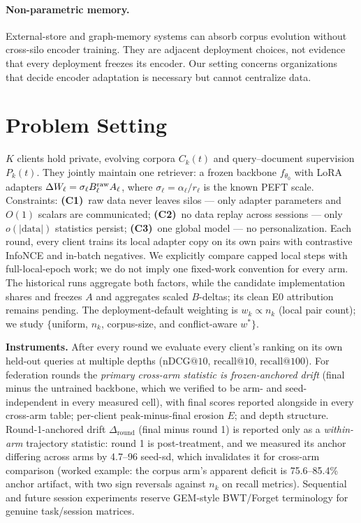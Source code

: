 \documentclass[sigconf,anonymous,review]{acmart}
\makeatletter
\newcommand{\ndcg}{\mathrm{nDCG@10}}
\newcommand{\rc}[1]{\mathrm{recall@#1}}
\newcommand{\RoundDrift}{\Delta_{\mathrm{round}}}
\makeatother
\begin{document}
\paragraph{Non-parametric memory.} External-store and graph-memory systems can absorb corpus evolution without cross-silo encoder training. They are adjacent deployment choices, not evidence that every deployment freezes its encoder. Our setting concerns organizations that decide encoder adaptation is necessary but cannot centralize data.

\section{Problem Setting}\label{sec:setting}
$K$ clients hold private, evolving corpora $C_k(t)$ and query--document supervision $P_k(t)$. They jointly maintain one retriever: a frozen backbone $f_{\theta_0}$ with LoRA adapters $\Delta W_\ell = \sigma_\ell B^{\rm raw}_\ell A_\ell$, where $\sigma_\ell=\alpha_\ell/r_\ell$ is the known PEFT scale. Constraints: \textbf{(C1)}~raw data never leaves silos --- only adapter parameters and $O(1)$ scalars are communicated; \textbf{(C2)}~no data replay across sessions --- only $o(|\mathrm{data}|)$ statistics persist; \textbf{(C3)}~one global model --- no personalization. Each round, every client trains its local adapter copy on its own pairs with contrastive InfoNCE and in-batch negatives. We explicitly compare capped local steps with full-local-epoch work; we do not imply one fixed-work convention for every arm. The historical runs aggregate both factors, while the candidate implementation shares and freezes $A$ and aggregates scaled $B$-deltas; its clean E0 attribution remains pending. The deployment-default weighting is $w_k \propto n_k$ (local pair count); we study $\{$uniform, $n_k$, corpus-size, and conflict-aware $w^\ast\}$.

\textbf{Instruments.} After every round we evaluate every client's ranking on its own held-out queries at multiple depths ($\ndcg$, $\rc{10}$, $\rc{100}$). For federation rounds the \emph{primary cross-arm statistic is frozen-anchored drift} (final minus the untrained backbone, which we verified to be arm- and seed-independent in every measured cell), with final scores reported alongside in every cross-arm table; per-client peak-minus-final erosion $E$; and depth structure. Round-1-anchored drift $\RoundDrift$ (final minus round 1) is reported only as a \emph{within-arm} trajectory statistic: round 1 is post-treatment, and we measured its anchor differing across arms by 4.7--96 seed-sd, which invalidates it for cross-arm comparison (worked example: the corpus arm's apparent deficit is 75.6--85.4\% anchor artifact, with two sign reversals against $n_k$ on recall metrics). Sequential and future session experiments reserve GEM-style BWT/Forget terminology for genuine task/session matrices.
\end{document}
